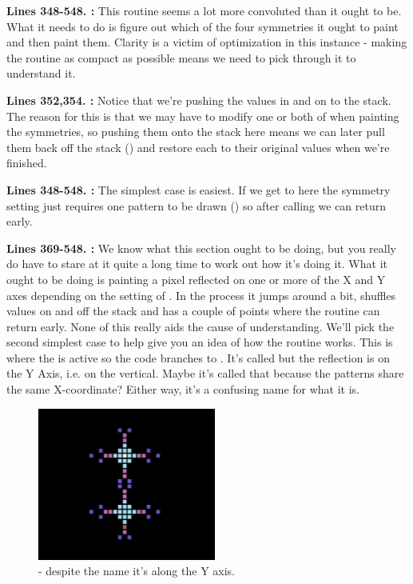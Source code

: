 \textbf{Lines 348-548. :} This routine seems a lot more convoluted than it
ought to be. What it needs to do is figure out which of the four symmetries it ought to paint and then paint them. Clarity
is a victim of optimization in this instance - making the routine as compact as possible means we need to pick through it
to understand it.

\textbf{Lines 352,354. :} Notice that we're pushing the values in  and 
on to the stack. The reason for this is that we may have to modify one or both of  when
painting the symmetries, so pushing them onto the stack here means we can later pull them back off the stack () and restore each to their original
values when we're finished.

\textbf{Lines 348-548. :} The simplest case is easiest. If we get to here
the symmetry setting just requires one pattern to be drawn () so after calling 
we can return early.

\textbf{Lines 369-548. :} We know what this section ought to be doing, but you really do have
to stare at it quite a long time to work out how it's doing it. What it ought to be doing is painting a pixel reflected on one or more
of the X and Y axes depending on the setting of . In the process it jumps around a bit,
shuffles values on and off the stack and has a couple of points where the routine can return early. None of this really aids
the cause of understanding. We'll pick the second simplest case to help give you an idea of how the routine works. This is where
the  is active so the code branches to .
It's called  but the reflection is on the Y Axis, i.e.
on the vertical. Maybe it's called that because the patterns share the same X-coordinate? Either way, it's a confusing name for what
it is.

\begin{figure}[H]
    \centering
      \includegraphics[height=5cm]{src/symmetries/xaxis.png}
  \caption*{ - despite the name it's along the Y axis.}
\end{figure}

